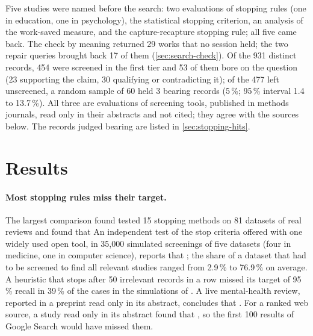 Five studies were named before the search: two evaluations of stopping
rules (one in education, one in psychology), the statistical stopping
criterion, an analysis of the work-saved measure, and the
capture-recapture stopping rule; all five came back.
The check by meaning returned 29 works that no session held; the two
repair queries brought back 17 of them (\cref{sec:search-check}).
Of the 931 distinct records, 454 were screened in the first tier and 53
of them bore on the question (23 supporting the claim, 30 qualifying or
contradicting it); of the 477 left unscreened, a random sample of 60
held 3 bearing records (5\,\%; 95\,\% interval 1.4 to 13.7\,\%).
All three are evaluations of screening tools, published in methods
journals, read only in their abstracts and not cited; they agree with
the sources below.
The records judged bearing are listed in \cref{sec:stopping-hits}.

\section{Results}
\label{sec:stopping-results}

\paragraph{Most stopping rules miss their target.}
The largest comparison found tested 15 stopping methods on 81 datasets
of real reviews and found that
An independent test of the stop criteria offered with one widely used
open tool, in 35,000 simulated screenings of five datasets (four in
medicine, one in computer science), reports that ; the share of a dataset that had to be screened to
find all relevant studies ranged from 2.9\,\% to 76.9\,\% on average.
A heuristic that stops after 50 irrelevant records in a row missed its
target of 95\,\% recall in 39\,\% of the cases in the simulations of
\textcite[p.~11]{Callaghan2020}.
A live mental-health review, reported in a preprint read only in its
abstract, concludes that .
For a ranked web source, a study read only in its abstract found that
, so the first
100 results of Google Search would have missed them.

